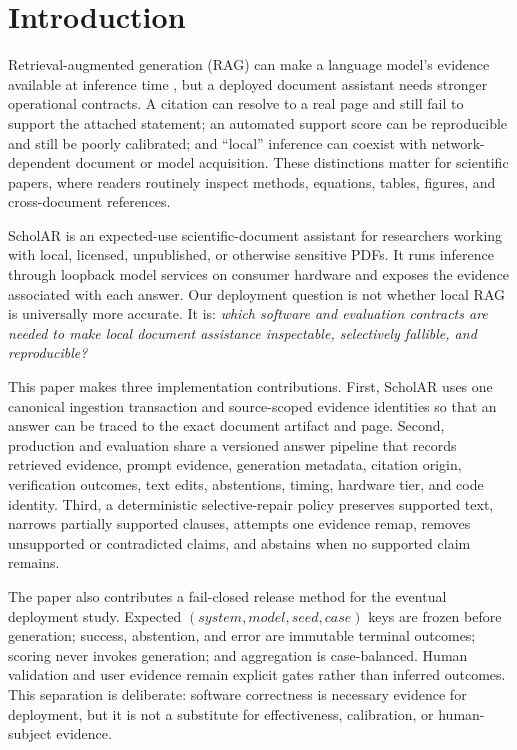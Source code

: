 \section{Introduction}
Retrieval-augmented generation (RAG) can make a language model's evidence available at inference time \citep{lewis2020rag}, but a deployed document assistant needs stronger operational contracts. A citation can resolve to a real page and still fail to support the attached statement; an automated support score can be reproducible and still be poorly calibrated; and ``local'' inference can coexist with network-dependent document or model acquisition. These distinctions matter for scientific papers, where readers routinely inspect methods, equations, tables, figures, and cross-document references.

ScholAR is an expected-use scientific-document assistant for researchers working with local, licensed, unpublished, or otherwise sensitive PDFs. It runs inference through loopback model services on consumer hardware and exposes the evidence associated with each answer. Our deployment question is not whether local RAG is universally more accurate. It is: \emph{which software and evaluation contracts are needed to make local document assistance inspectable, selectively fallible, and reproducible?}

This paper makes three implementation contributions. First, ScholAR uses one canonical ingestion transaction and source-scoped evidence identities so that an answer can be traced to the exact document artifact and page. Second, production and evaluation share a versioned answer pipeline that records retrieved evidence, prompt evidence, generation metadata, citation origin, verification outcomes, text edits, abstentions, timing, hardware tier, and code identity. Third, a deterministic selective-repair policy preserves supported text, narrows partially supported clauses, attempts one evidence remap, removes unsupported or contradicted claims, and abstains when no supported claim remains.

The paper also contributes a fail-closed release method for the eventual deployment study. Expected $(\textit{system}, \textit{model}, \textit{seed}, \textit{case})$ keys are frozen before generation; success, abstention, and error are immutable terminal outcomes; scoring never invokes generation; and aggregation is case-balanced. Human validation and user evidence remain explicit gates rather than inferred outcomes. This separation is deliberate: software correctness is necessary evidence for deployment, but it is not a substitute for effectiveness, calibration, or human-subject evidence.
